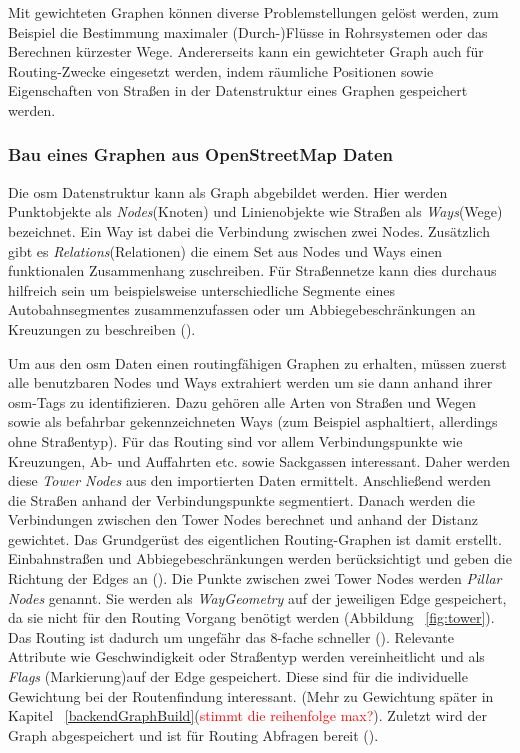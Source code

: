 \documentclass[12pt,a4paper]{article}
\newcommand\todo[1]{\textcolor{red}{#1}}
\begin{document}
Mit gewichteten Graphen können diverse Problemstellungen gelöst werden, zum Beispiel die Bestimmung maximaler (Durch-)Flüsse in Rohrsystemen oder das Berechnen kürzester Wege. Andererseits kann ein gewichteter Graph auch für Routing-Zwecke eingesetzt werden, indem räumliche Positionen sowie Eigenschaften von Straßen in der Datenstruktur eines Graphen gespeichert werden.

\subsubsection{Bau eines Graphen aus OpenStreetMap Daten}
\label{sec:osmgraph}

Die \gls{osm} Datenstruktur kann als Graph abgebildet werden. Hier werden Punktobjekte als \textit{Nodes}(Knoten) und Linienobjekte wie Straßen als \textit{Ways}(Wege) bezeichnet. Ein Way ist dabei die Verbindung zwischen zwei Nodes. Zusätzlich gibt es \textit{Relations}(Relationen) die einem Set aus Nodes und Ways einen funktionalen Zusammenhang zuschreiben. Für Straßennetze kann dies durchaus hilfreich sein um beispielsweise unterschiedliche Segmente eines Autobahnsegmentes zusammenzufassen oder um Abbiegebeschränkungen an Kreuzungen zu beschreiben (\cite{osmrelation}).

Um aus den \gls{osm} Daten einen routingfähigen Graphen zu erhalten, müssen zuerst alle benutzbaren Nodes und Ways extrahiert werden um sie dann anhand ihrer \gls{osm}-Tags zu identifizieren. Dazu gehören alle Arten von Straßen und Wegen sowie als befahrbar gekennzeichneten Ways (zum Beispiel asphaltiert, allerdings ohne Straßentyp). Für das Routing sind vor allem Verbindungspunkte wie Kreuzungen, Ab- und Auffahrten etc. sowie Sackgassen interessant. Daher werden diese \textit{Tower Nodes} aus den importierten Daten ermittelt. Anschließend werden die Straßen anhand der Verbindungspunkte segmentiert. Danach werden die Verbindungen zwischen den Tower Nodes berechnet und anhand der Distanz gewichtet. Das Grundgerüst des eigentlichen Routing-Graphen ist damit erstellt. Einbahnstraßen und Abbiegebeschränkungen werden berücksichtigt und geben die Richtung der Edges an (\cite{osmgraph}). Die Punkte zwischen zwei Tower Nodes werden \textit{Pillar Nodes} genannt. Sie werden als \textit{WayGeometry} auf der jeweiligen Edge gespeichert, da sie nicht für den Routing Vorgang benötigt werden (Abbildung ~\ref{fig:tower}). Das Routing ist dadurch um ungefähr das 8-fache schneller (\cite{graphhopper}). Relevante Attribute wie Geschwindigkeit oder Straßentyp werden vereinheitlicht und als \textit{Flags} (Markierung)auf der Edge gespeichert. Diese sind für die individuelle Gewichtung bei der Routenfindung interessant. (Mehr zu Gewichtung später in Kapitel ~\ref{backendGraphBuild}(\todo{stimmt die reihenfolge max?}). Zuletzt wird der Graph abgespeichert und ist für Routing Abfragen bereit (\cite{osmgraph}). 
\end{document}
